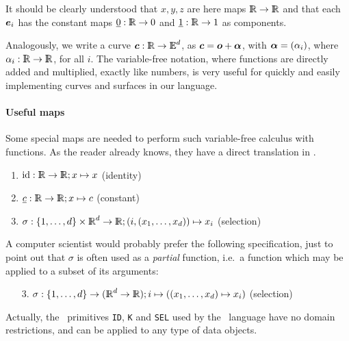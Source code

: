 \documentclass{31x47jw}
\begin{document}
It should be clearly understood that $x, y, z$ %
are here maps $\mathbb{I\!\!R}\rightarrow\mathbb{I\!\!R}$ and that each ${\mbox{\boldmath $e$}}_{i}$ has the
constant maps $\underline{0}:\mathbb{I\!\!R}\rightarrow 0$ and
$\underline{1}:\mathbb{I\!\!R}\rightarrow 1$ as components.

Analogously, we write a curve ${\mbox{\boldmath $c$}}:\mathbb{I\!\!R}\rightarrow \mathbb{I\!\!E}^{d}$, as
${\mbox{\boldmath $c$}}={\mbox{\boldmath $o$}}+{\mbox{\boldmath $\alpha$}}$, with ${\mbox{\boldmath $\alpha$}}=(\alpha_{i})$, where
$\alpha_{i}: \mathbb{I\!\!R}\rightarrow\mathbb{I\!\!R}$, for all $i$.  The variable-free
notation, where functions are directly added and multiplied, exactly
like numbers, is very useful for quickly and easily implementing
curves and surfaces in our language.

\paragraph{Useful maps}

Some special maps are needed to perform such variable-free calculus
with functions.  As the reader already knows, they have a direct
translation in \pl.
\begin{enumerate}
    
    \item    
    $\textrm{id}: \mathbb{I\!\!R}\rightarrow\mathbb{I\!\!R}; x\mapsto x$
    \hfill ({identity})
    
    \item    
    $\underline{c}: \mathbb{I\!\!R}\rightarrow\mathbb{I\!\!R}; x\mapsto c$
    \hfill (constant)
    
    \item    
    $\sigma: \{1,\ldots,d\}\times \mathbb{I\!\!R}^{d}\rightarrow\mathbb{I\!\!R};
    (i,(x_{1},\ldots,x_{d}))\mapsto x_{i}$ \hfill (selection)

\end{enumerate}

A computer scientist would probably prefer the following 
specification, just to point out that $\sigma$ is often used as a 
\emph{partial} function, i.e.~a function which may be applied to a 
subset of its arguments:
\begin{enumerate}
    
    \item[3.]
    $\sigma: \{1,\ldots,d\}\rightarrow(\mathbb{I\!\!R}^{d}\rightarrow\mathbb{I\!\!R});
    i\mapsto((x_{1},\ldots,x_{d})\mapsto x_{i})$ \hfill (selection)

\end{enumerate}

Actually, the \fl\ primitives \texttt{ID}, \texttt{K} and \texttt{SEL}
used by the \pl\ language have no domain restrictions, and can be
applied to any type of data objects.
\end{document}
